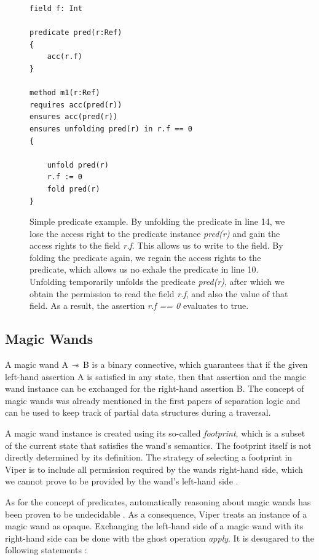\documentclass[12pt]{article}
\begin{document}
\begin{figure}[h]
  \centering
\begin{lstlisting}
field f: Int

predicate pred(r:Ref)
{
    acc(r.f)
}

method m1(r:Ref)
requires acc(pred(r))
ensures acc(pred(r))
ensures unfolding pred(r) in r.f == 0
{

    unfold pred(r)
    r.f := 0
    fold pred(r)
}
\end{lstlisting}
\caption[predicate example]
   {Simple predicate example. By unfolding the predicate in line 14, we lose the access right to the predicate instance \textit{pred(r)} and gain the access rights to the field \textit{r.f}. This allows us to write to the field. By folding the predicate again, we regain the access rights to the predicate, which allows us no exhale the predicate in line 10. Unfolding temporarily unfolds the predicate \textit{pred(r)}, after which we obtain the permission to read the field \textit{r.f}, and also the value of that field. As a result, the assertion \textit{r.f == 0} evaluates to true.}
\label{predicateExample}
\end{figure}

\subsection{Magic Wands}
A magic wand A \(\mathbin{-\!\!*}\) B is a binary connective, which guarantees that if the given left-hand assertion A is satisfied in any state, then that assertion and the magic wand instance can be exchanged for the right-hand assertion B. The concept of magic wands was already mentioned in the first papers of separation logic \cite{reynolds2002separation} and can be used to keep track of partial data structures during a traversal.

A magic wand instance is created using its so-called \textit{footprint}, which is a subset of the current state that satisfies the wand's semantics. The footprint itself is not directly determined by its definition. The strategy of selecting a footprint in Viper is to include all permission required by the wands right-hand side, which we cannot prove to be provided by the wand's left-hand side \cite{magicwand}.

As for the concept of predicates, automatically reasoning about magic wands has been proven to be undecidable \cite{brochenin2008almighty}. As a consequence, Viper treats an instance of a magic wand as opaque. Exchanging the left-hand side of a magic wand with its right-hand side can be done with the ghost operation \textit{apply}. It is desugared to the following statements \cite{magicwand}:
\end{document}
